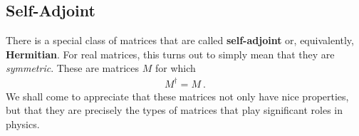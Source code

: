 \documentclass[12pt, oneside]{report}    %
\begin{document}

\subsection{Self-Adjoint}

There is a special class of matrices that are called \textbf{self-adjoint} or, equivalently, \textbf{Hermitian}. For real matrices, this turns out to simply mean that they are \emph{symmetric}. These are matrices $M$ for which 
\begin{align}
    M^\dag = M \ .
\end{align}
We shall come to appreciate that these matrices not only have nice properties, but that they are precisely the types of matrices that play significant roles in physics.
\end{document}
